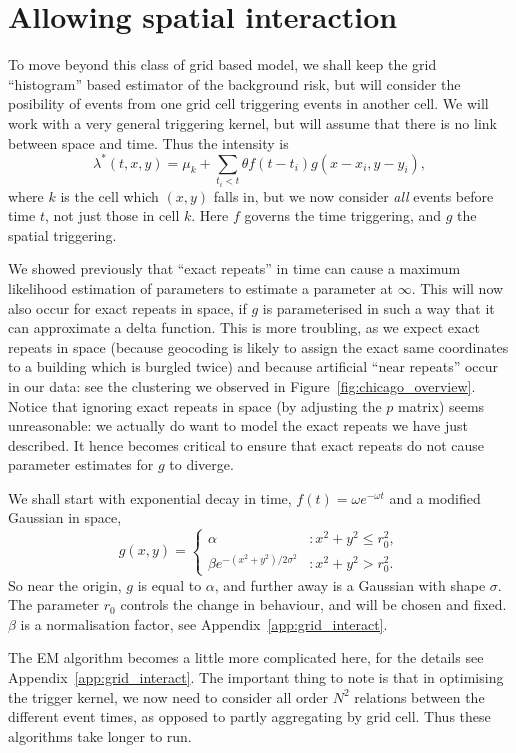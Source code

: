 \documentclass[twoside,a4paper]{article}
\theoremstyle{plain}
\theoremstyle{definition}
\begin{document}
\section{Allowing spatial interaction}\label{sec:grid_interact}

To move beyond this class of grid based model, we shall keep the grid ``histogram'' based
estimator of the background risk, but will consider the posibility of events from one grid
cell triggering events in another cell.  We will work with a very general triggering kernel,
but will assume that there is no link between space and time.  Thus the intensity is
\[ \lambda^*(t,x,y) = \mu_k + \sum_{t_i<t} \theta f(t-t_i) g(x-x_i, y-y_i), \]
where $k$ is the cell which $(x,y)$ falls in, but we now consider \emph{all} events before
time $t$, not just those in cell $k$.  Here $f$ governs the time triggering, and $g$ the
spatial triggering.

We showed previously that ``exact repeats'' in time can cause a maximum likelihood estimation of
parameters to estimate a parameter at $\infty$.  This will now also occur for exact repeats
in space, if $g$ is parameterised in such a way that it can approximate a delta function.
This is more troubling, as we expect exact repeats in space (because geocoding is likely
to assign the exact same coordinates to a building which is burgled twice) and because
artificial ``near repeats'' occur in our data: see the clustering we
observed in Figure~\ref{fig:chicago_overview}.  Notice that ignoring exact repeats in space
(by adjusting the $p$ matrix) seems unreasonable: we actually do want to model the exact repeats
we have just described.  It hence becomes critical to ensure that exact repeats do not
cause parameter estimates for $g$ to diverge.

We shall start with exponential decay in time, $f(t) = \omega e^{-\omega t}$ and a modified
Gaussian in space,
\[ g(x,y) = \begin{cases} \alpha &: x^2+y^2\leq r_0^2, \\
\beta e^{-(x^2+y^2)/2\sigma^2} &: x^2+y^2 > r_0^2. \end{cases} \]
So near the origin, $g$ is equal to $\alpha$, and further away is a Gaussian with shape
$\sigma$.  The parameter $r_0$ controls the change in behaviour, and will be chosen and fixed.
$\beta$ is a normalisation factor, see Appendix~\ref{app:grid_interact}.

The EM algorithm becomes a little more complicated here, for the details see
Appendix~\ref{app:grid_interact}.  The important thing to note is that in optimising the
trigger kernel, we now need to consider all order $N^2$ relations between the different
event times, as opposed to partly aggregating by grid cell.  Thus these algorithms take
longer to run.
\end{document}
